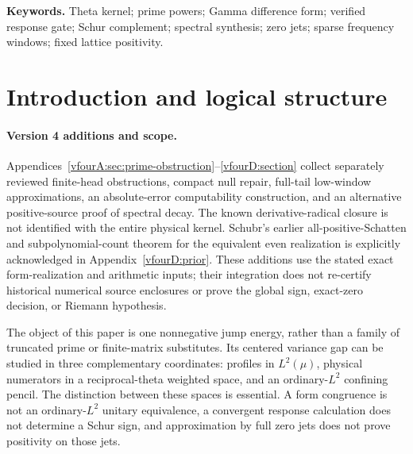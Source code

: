 \documentclass[11pt,a4paper]{article}
\numberwithin{equation}{section}
\theoremstyle{definition}\newtheorem{definition}[theorem]{Definition}
\theoremstyle{remark}\newtheorem{remark}[theorem]{Remark}
\begin{document}
\begin{abstract}
multiple of this scale gives eventual positivity; Appendix~\ref{app:growing-zero-bands} retains the precise hypotheses and full proof. These restricted positivity results do not establish positivity on arbitrary unions or the full zero family. The global half inequality and the Riemann hypothesis remain unproved.
 New appendices analyze finite-prime artifacts, exact known-radical repair, quantitative low-window tail compression, and absolute-error computability of the centered ground energy under the stated inputs. A source-compression proof gives a subpolynomial negative-count bound and all-positive-exponent Schatten membership; these qualitative conclusions were previously obtained by Schubr for the equivalent even realization. None resolves the global sign or the Riemann hypothesis.
\end{abstract}
\noindent\textbf{Keywords.} Theta kernel; prime powers; Gamma difference form; verified response gate; Schur complement; spectral synthesis; zero jets; sparse frequency windows; fixed lattice positivity.
\clearpage\setcounter{tocdepth}{1}\tableofcontents\clearpage

\section{Introduction and logical structure}\label{sec:intro}

\paragraph{Version 4 additions and scope.}
Appendices~\ref{vfourA:sec:prime-obstruction}--\ref{vfourD:section} collect separately reviewed finite-head obstructions, compact null repair, full-tail low-window approximations, an absolute-error computability construction, and an alternative positive-source proof of spectral decay. The known derivative-radical closure is not identified with the entire physical kernel. Schubr's earlier all-positive-Schatten and subpolynomial-count theorem for the equivalent even realization is explicitly acknowledged in Appendix~\ref{vfourD:prior}. These additions use the stated exact form-realization and arithmetic inputs; their integration does not re-certify historical numerical source enclosures or prove the global sign, exact-zero decision, or Riemann hypothesis.

The object of this paper is one nonnegative jump energy, rather than a family of truncated prime or finite-matrix substitutes. Its centered variance gap can be studied in three complementary coordinates: profiles in $L^2(\mu)$, physical numerators in a reciprocal-theta weighted space, and an ordinary-$L^2$ confining pencil. The distinction between these spaces is essential. A form congruence is not an ordinary-$L^2$ unitary equivalence, a convergent response calculation does not determine a Schur sign, and approximation by full zero jets does not prove positivity on those jets.
\end{document}
